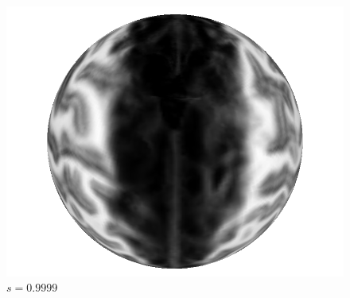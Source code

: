 \documentclass[11pt]{amsart}
\begin{document}
\begin{figure}[H]
\begin{center}
\begin{minipage}[!h]{0.27\textwidth}
\centering
\includegraphics[width=\textwidth]{subject1CMCF14}
\caption*{$s = 0.9999$} \label{fig:subjectcmcf14}
\end{minipage}
\end{center}
\end{figure}
\end{document}
